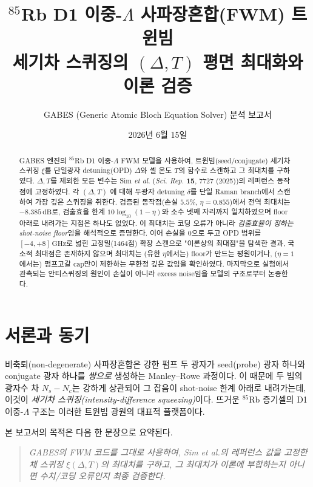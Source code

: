 \documentclass[11pt,a4paper]{article}
\title{\textbf{$^{85}$Rb D1 이중-$\Lambda$ 사파장혼합(FWM) 트윈빔\\
세기차 스퀴징의 $(\Delta,T)$ 평면 최대화와 이론 검증}}
\author{GABES (Generic Atomic Bloch Equation Solver) 분석 보고서}
\date{2026년 6월 15일}
\newcommand{\dB}{\,\mathrm{dB}}
\newcommand{\GHz}{\,\mathrm{GHz}}
\begin{document}
\maketitle

\begin{abstract}
\noindent
GABES 엔진의 $^{85}$Rb D1 이중-$\Lambda$ FWM 모델을 사용하여, 트윈빔(seed/conjugate)
세기차 스퀴징 $\xi$를 단일광자 detuning(OPD) $\Delta$와 셀 온도 $T$의 함수로 스캔하고
그 최대치를 구하였다. $\Delta,T$를 제외한 모든 변수는 Sim \textit{et al.}
(\textit{Sci. Rep.} \textbf{15}, 7727 (2025))의 레퍼런스 동작점에 고정하였다. 각 $(\Delta,T)$
에 대해 두광자 detuning $\delta$를 단일 Raman branch에서 스캔하여 가장 깊은 스퀴징을 취한다.
검증된 동작점(손실 $5.5\%$, $\eta=0.855$)에서 전역 최대치는 $-8.385\dB$로,
검출효율 한계 $10\log_{10}(1-\eta)$와 소수 넷째 자리까지 일치하였으며 floor 아래로
내려가는 지점은 하나도 없었다. 이 최대치는 코딩 오류가 아니라 \emph{검출효율이 정하는
shot-noise floor}임을 해석적으로 증명한다. 이어 손실을 $0$으로 두고 OPD 범위를
$[-4,+8]\GHz$로 넓힌 고정밀(1464점) 확장 스캔으로 "이론상의 최대점"을 탐색한 결과,
국소적 최대점은 존재하지 않으며 최대치는 (유한 $\eta$에서는) floor가 만드는 평원이거나,
($\eta=1$에서는) 펌프고갈 cap만이 제한하는 무한정 깊은 값임을 확인하였다. 마지막으로
실험에서 관측되는 안티스퀴징의 원인이 손실이 아니라 excess noise임을 모델의 구조로부터
논증한다.
\end{abstract}

\tableofcontents
\bigskip

\section{서론과 동기}
비축퇴(non-degenerate) 사파장혼합은 강한 펌프 두 광자가 seed(probe) 광자 하나와
conjugate 광자 하나를 \emph{쌍으로} 생성하는 Manley--Rowe 과정이다. 이 때문에 두 빔의
광자수 차 $N_s-N_c$는 강하게 상관되어 그 잡음이 shot-noise 한계 아래로 내려가는데, 이것이
\emph{세기차 스퀴징(intensity-difference squeezing)}이다. 뜨거운 $^{85}$Rb 증기셀의
D1 이중-$\Lambda$ 구조는 이러한 트윈빔 광원의 대표적 플랫폼이다.

본 보고서의 목적은 다음 한 문장으로 요약된다.

\begin{quote}
\itshape
GABES의 FWM 코드를 그대로 사용하여, Sim \textit{et al.}의 레퍼런스 값을 고정한 채
스퀴징 $\xi(\Delta,T)$의 최대치를 구하고, 그 최대치가 이론에 부합하는지 아니면 수치/코딩
오류인지 최종 검증한다.
\end{quote}
\end{document}

